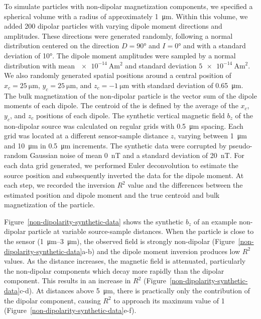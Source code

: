To simulate particles with non-dipolar magnetization components, we specified a spherical volume with a radius of approximately \qty{1}{\um}.
Within this volume, we added 200 dipolar particles with varying dipole moment directions and amplitudes.
These directions were generated randomly, following a normal distribution centered on the direction $D=\ang{90}$ and $I=\ang{0}$ and with a standard deviation of \ang{10}.
The dipole moment amplitudes were sampled by a normal distribution with mean $\qty{e-14}{\ampere\m\squared}$ and standard deviation $\qty{5e-14}{\ampere\m\squared}$.
We also randomly generated spatial positions around a central position of $x_c=\qty{25}{\um}$, $y_c=\qty{25}{\um}$, and $z_c=\qty{-1}{\um}$ with standard deviation of \qty{0.65}{\um}.
The bulk magnetization of the non-dipolar particle is the vector sum of the dipole moments of each dipole.
The centroid of the \DIFdelbegin {}\DIFdelend \DIFaddbegin {}\DIFaddend is defined by the average of the $x_c$, $y_c$, and $z_c$ positions of each dipole.
The synthetic vertical magnetic field $b_z$ of the non-dipolar source was calculated on regular grids with \qty{0.5}{\um} spacing.
Each grid was located at a different sensor-sample distance $z$, varying between \qty{1}{\um} and \qty{10}{\um} in \qty{0.5}{\um} increments.
The synthetic data were corrupted by pseudo-random Gaussian noise of mean \qty{0}{\nano\tesla} and a standard deviation of \qty{20}{\nano\tesla}.
For each data grid generated, we performed Euler deconvolution to estimate the source position and subsequently inverted the data for the dipole moment.
At each step, we recorded the inversion $R^2$ value and the differences between the estimated position and dipole moment and the true centroid and bulk magnetization of the \DIFaddbegin {}\DIFaddend particle.

Figure~\ref{non-dipolarity-synthetic-data} shows the synthetic $b_z$ of an example non-dipolar particle at variable source-sample distances.
When the particle is close to the sensor (\qtyrange{1}{3}{\um}), the observed field is strongly non-dipolar (Figure~\ref{non-dipolarity-synthetic-data}a-b) and the dipole moment inversion produces low $R^2$ values.
As the distance increases, the magnetic field is attenuated, particularly the non-dipolar components which decay more rapidly than the dipolar component.
This results in an increase in $R^2$ (Figure~\ref{non-dipolarity-synthetic-data}c-d).
At distances above \qty{5}{\um}, there is practically only the contribution of the dipolar component, causing $R^2$ to approach its maximum value of 1 (Figure~\ref{non-dipolarity-synthetic-data}e-f).


